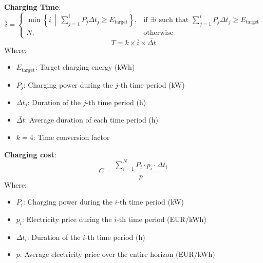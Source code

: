 \documentclass[
	english,
	ruledheaders=section,%
	class=report,%
	thesis={type=Report},%
	accentcolor=9c,%
	custommargins=true,%
	marginpar=false,%
	parskip=half-,%
	fontsize=11pt,%
	logofile={img/tuda_logo.pdf}, %
]{tudapub}
\begin{document}
\textbf{Charging Time}: 
\begin{equation}
\label{eq: charging time}
\overline{i} = 
\begin{cases}
\min \left\{ i \,\middle|\, \sum_{j=1}^{i} P_j \Delta t_j \geq E_{\text{target}} \right\}, & \text{if } \exists i \text{ such that } \sum_{j=1}^{i} P_j \Delta t_j \geq E_{\text{target}} \\
N, & \text{otherwise}
\end{cases}
\end{equation}
\begin{equation}
T = k \times \overline{i} \times \bar{\Delta t}
\end{equation}
Where: 
\begin{itemize}
    \item $E_{\text{target}}$: Target charging energy (kWh)
    \item $P_j$: Charging power during the $j$-th time period (kW)
    \item $\Delta t_j$: Duration of the $j$-th time period (h)
    \item $\bar{\Delta t}$: Average duration of each time period (h)
    \item $k=4$: Time conversion factor
\end{itemize}

\textbf{Charging cost}: 
\begin{equation}
C = \frac{\sum_{i=1}^{N} P_i \cdot p_i \cdot \Delta t_i}{\bar{p}}
\end{equation}
Where: 
\begin{itemize}
    \item $P_i$: Charging power during the $i$-th time period (kW)
    \item $p_i$: Electricity price during the $i$-th time period (EUR/kWh)
    \item $\Delta t_i$: Duration of the $i$-th time period (h)
    \item $\bar{p}$: Average electricity price over the entire horizon (EUR/kWh)
\end{itemize}
\end{document}
